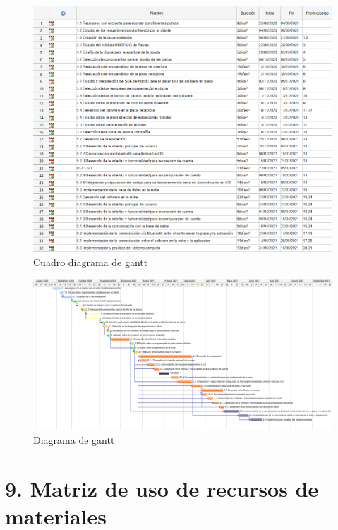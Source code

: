 \documentclass[11pt]{charter}
\begin{document}
\begin{figure}[htbp]
\centering
\includegraphics[width=1\textwidth]{./Figuras/DdG (2).png}
\caption{Cuadro diagrama de gantt}
\label{fig:gantt}
\end{figure}

\begin{figure}[htbp]

\centering
\includegraphics[width=1.5\textwidth , angle=90]{./Figuras/DdG (1).png}
\caption{Diagrama de gantt}
\label{fig:gantt}
\end{figure}

\section{9. Matriz de uso de recursos de materiales}
\label{sec:recursos}
\end{document}
